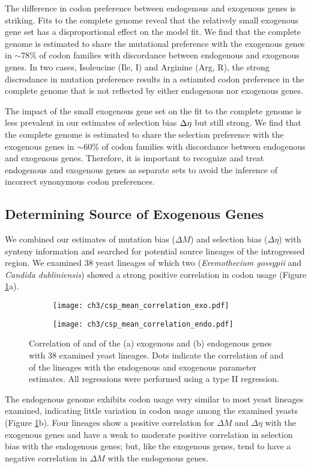 The difference in codon preference between endogenous and exogenous genes is striking.
Fits to the complete \kluyveri genome reveal that the relatively small exogenous gene set has a disproportional effect on the model fit.
We find that the complete \kluyveri genome is estimated to share the mutational preference with the exogenous genes in $\sim78\%$ of codon families with discordance between endogenous and exogenous genes.
In two cases, Isoleucine (Ile, I) and Arginine (Arg, R), the strong discrodance in mutation preference results in a estiamted codon preference in the complete \kluyveri genome that is not reflected by either endogenous nor exogenous genes.

The impact of the small exogenous gene set on the fit to the complete \kluyveri genome is less prevalent in our estimates of selection bias ${\Delta \eta}$ but still strong.
We find that the complete \kluyveri genome is estimated to share the selection preference with the exogenous genes in $\sim60\%$ of codon families with discordance between endogenous and exogenous genes.
Therefore, it is important to recognize and treat endogenous and exogenous genes as separate sets to avoid the inference of incorrect synonymous codon preferences.

\subsection{Determining Source of Exogenous Genes}

We combined our estimates of mutation bias ($\Delta M$) and selection bias ($\Delta \eta$) with synteny information and searched for potential source lineages of the introgressed region.
We examined 38 yeast lineages of which two (\textit{Eremothecium gossypii} and \textit{Candida dubliniensis}) showed a strong positive correlation in codon usage (Figure \ref{fig:csp_endo_exo_comp}a).
\begin{figure}[h]
    \centering
    \begin{subfigure}
        \centering
        \texttt{[image: ch3/csp\_mean\_correlation\_exo.pdf]}
    \end{subfigure}
    \begin{subfigure}
        \centering
        \texttt{[image: ch3/csp\_mean\_correlation\_endo.pdf]}
    \end{subfigure}
    \caption{Correlation of \DM and \DE of the (a) exogenous and (b) endogenous genes with 38 examined yeast lineages. Dots indicate the correlation of \DM and \DE of the lineages with the endogenous and exogenous parameter estimates. All regressions were performed using a type II regression.}
    \label{fig:csp_endo_exo_comp}
\end{figure}
The endogenous \kluyveri genome exhibits codon usage very similar to most yeast lineages examined, indicating little variation in codon usage among the examined yeasts (Figure \ref{fig:csp_endo_exo_comp}b).
Four lineages show a positive correlation for $\Delta M$ and $\Delta \eta$ with the exogenous genes and have a weak to moderate positive correlation in selection bias with the endogenous genes; but, like the exogenous genes, tend to have a negative correlation in $\Delta M$ with the endogenous genes.


